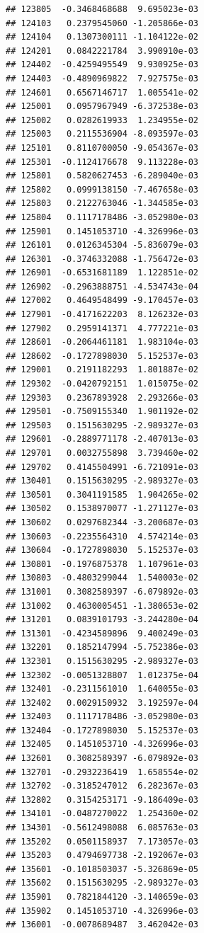\documentclass[ignorenonframetext,]{beamer}
\begin{document}
\begin{frame}[fragile]
\begin{verbatim}
## 123805  -0.3468468688  9.695023e-03
## 124103   0.2379545060 -1.205866e-03
## 124104   0.1307300111 -1.104122e-02
## 124201   0.0842221784  3.990910e-03
## 124402  -0.4259495549  9.930925e-03
## 124403  -0.4890969822  7.927575e-03
## 124601   0.6567146717  1.005541e-02
## 125001   0.0957967949 -6.372538e-03
## 125002   0.0282619933  1.234955e-02
## 125003   0.2115536904 -8.093597e-03
## 125101   0.8110700050 -9.054367e-03
## 125301  -0.1124176678  9.113228e-03
## 125801   0.5820627453 -6.289040e-03
## 125802   0.0999138150 -7.467658e-03
## 125803   0.2122763046 -1.344585e-03
## 125804   0.1117178486 -3.052980e-03
## 125901   0.1451053710 -4.326996e-03
## 126101   0.0126345304 -5.836079e-03
## 126301  -0.3746332088 -1.756472e-03
## 126901  -0.6531681189  1.122851e-02
## 126902  -0.2963888751 -4.534743e-04
## 127002   0.4649548499 -9.170457e-03
## 127901  -0.4171622203  8.126232e-03
## 127902   0.2959141371  4.777221e-03
## 128601  -0.2064461181  1.983104e-03
## 128602  -0.1727898030  5.152537e-03
## 129001   0.2191182293  1.801887e-02
## 129302  -0.0420792151  1.015075e-02
## 129303   0.2367893928  2.293266e-03
## 129501  -0.7509155340  1.901192e-02
## 129503   0.1515630295 -2.989327e-03
## 129601  -0.2889771178 -2.407013e-03
## 129701   0.0032755898  3.739460e-02
## 129702   0.4145504991 -6.721091e-03
## 130401   0.1515630295 -2.989327e-03
## 130501   0.3041191585  1.904265e-02
## 130502   0.1538970077 -1.271127e-03
## 130602   0.0297682344 -3.200687e-03
## 130603  -0.2235564310  4.574214e-03
## 130604  -0.1727898030  5.152537e-03
## 130801  -0.1976875378  1.107961e-03
## 130803  -0.4803299044  1.540003e-02
## 131001   0.3082589397 -6.079892e-03
## 131002   0.4630005451 -1.380653e-02
## 131201   0.0839101793 -3.244280e-04
## 131301  -0.4234589896  9.400249e-03
## 132201   0.1852147994 -5.752386e-03
## 132301   0.1515630295 -2.989327e-03
## 132302  -0.0051328807  1.012375e-04
## 132401  -0.2311561010  1.640055e-03
## 132402   0.0029150932  3.192597e-04
## 132403   0.1117178486 -3.052980e-03
## 132404  -0.1727898030  5.152537e-03
## 132405   0.1451053710 -4.326996e-03
## 132601   0.3082589397 -6.079892e-03
## 132701  -0.2932236419  1.658554e-02
## 132702  -0.3185247012  6.282367e-03
## 132802   0.3154253171 -9.186409e-03
## 134101  -0.0487270022  1.254360e-02
## 134301  -0.5612498088  6.085763e-03
## 135202   0.0501158937  7.173057e-03
## 135203   0.4794697738 -2.192067e-03
## 135601  -0.1018503037 -5.326869e-05
## 135602   0.1515630295 -2.989327e-03
## 135901   0.7821844120 -3.140659e-03
## 135902   0.1451053710 -4.326996e-03
## 136001  -0.0078689487  3.462042e-03

\end{verbatim}
\end{frame}
\end{document}
